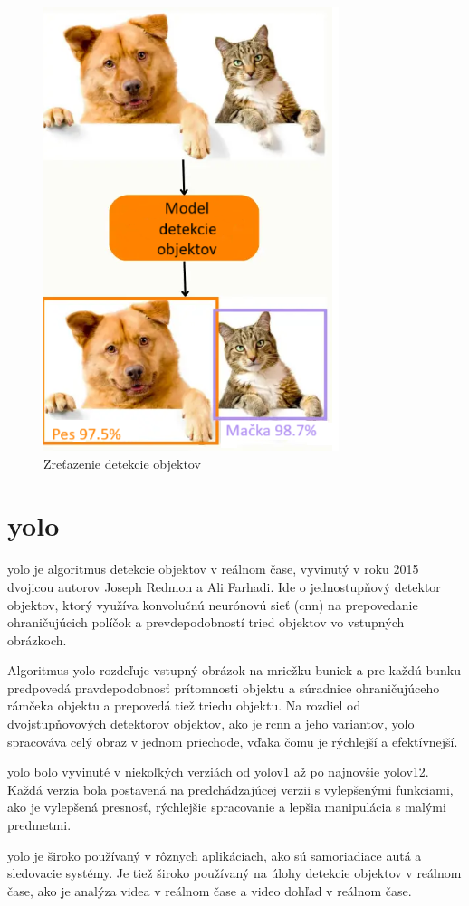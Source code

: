 \begin{figure}[H]
    \centering
    \includegraphics[width=0.45\linewidth]{figures/ODmodel.png}
    \caption{Zreťazenie detekcie objektov \label{ODmodel}}
    \label{fig:enter-label}
\end{figure}

\section{\acrshort{yolo}}

\acrshort{yolo} je algoritmus detekcie objektov v reálnom čase, vyvinutý v roku 2015 dvojicou autorov Joseph Redmon a Ali Farhadi.
Ide o jednostupňový detektor objektov, ktorý využíva konvolučnú neurónovú sieť (\acrshort{cnn}) na prepovedanie ohraničujúcich políčok a prevdepodobností tried objektov vo vstupných obrázkoch.

Algoritmus \acrshort{yolo} rozdeľuje vstupný obrázok na mriežku buniek a pre každú bunku predpovedá pravdepodobnosť prítomnosti objektu a súradnice ohraničujúceho rámčeka objektu a prepovedá tiež triedu objektu.
Na rozdiel od dvojstupňovových detektorov objektov, ako je \acrshort{rcnn} a jeho variantov, \acrshort{yolo} spracováva celý obraz v jednom priechode, vďaka čomu je rýchlejší a efektívnejší.

\acrshort{yolo} bolo vyvinuté v niekoľkých verziách od \acrshort{yolo}v1 až po najnovšie \acrshort{yolo}v12. Každá verzia bola postavená na predchádzajúcej verzii s vylepšenými funkciami, ako je vylepšená presnosť, rýchlejšie spracovanie a lepšia manipulácia s malými predmetmi.

\acrshort{yolo} je široko používaný v rôznych aplikáciach, ako sú samoriadiace autá a sledovacie systémy.
Je tiež široko používaný na úlohy detekcie objektov v reálnom čase, ako je analýza videa v reálnom čase a video dohľad v reálnom čase. \cite{kili}

